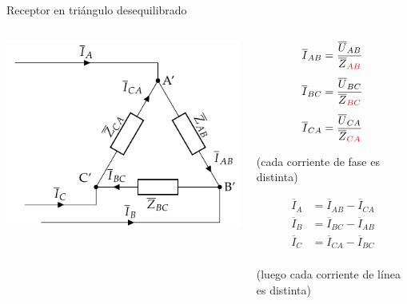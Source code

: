 \documentclass[aspectratio=169, usenames,svgnames,dvipsnames]{beamer}
\begin{document}
\begin{frame}{Receptor en triángulo desequilibrado}
    \begin{columns}
    \begin{column}{0.6\columnwidth}
        \begin{center}
            \includegraphics[width=.9\linewidth]{../figs/TrianguloDesequilibrado_Receptor.pdf}
        \end{center}
    \end{column}
    
    \begin{column}{0.4\columnwidth}
        \begin{align*}
          \overline{I}_{AB} &= \frac{\overline{U}_{AB}}{\overline{Z}_{\color{red}{AB}}}\\[4pt]
          \overline{I}_{BC} &= \frac{\overline{U}_{BC}}{\overline{Z}_{\color{red}{BC}}}\\[4pt]
          \overline{I}_{CA} &= \frac{\overline{U}_{CA}}{\overline{Z}_{\color{red}{CA}}}
        \end{align*}
        \begin{center}
            \footnotesize{(cada corriente de fase es \alert{distinta})}
        \end{center}        

        \vspace{-7mm}    
        \begin{align*}
          \overline{I}_A &= \overline{I}_{AB} - \overline{I}_{CA}\\
          \overline{I}_B &= \overline{I}_{BC} - \overline{I}_{AB}\\
          \overline{I}_C &= \overline{I}_{CA} - \overline{I}_{BC}\\
        \end{align*}

        \vspace{-9mm}   
        \begin{center}
            \footnotesize{(luego cada corriente de línea es \alert{distinta})}
        \end{center}
    \end{column}
    \end{columns}
\end{frame}
\end{document}
